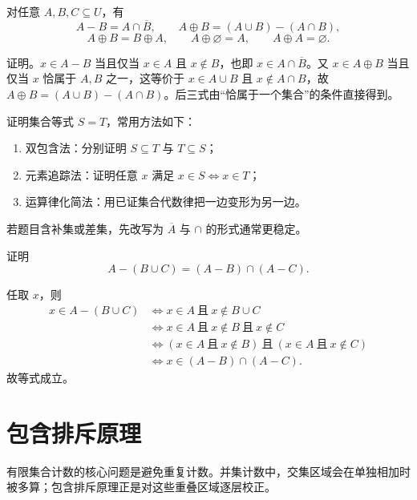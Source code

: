 \begin{theorem}[差集与对称差公式]\label{ch1-diff-sym-laws}
对任意 $A,B,C\subseteq U$，有
\[
  A-B=A\cap\overline B,\qquad
  A\oplus B=(A\cup B)-(A\cap B),
\]
\[
  A\oplus B=B\oplus A,\qquad
  A\oplus\varnothing=A,\qquad
  A\oplus A=\varnothing.
\]
\end{theorem}

证明。$x\in A-B$ 当且仅当 $x\in A$ 且 $x\notin B$，也即 $x\in A\cap\overline B$。又 $x\in A\oplus B$ 当且仅当 $x$ 恰属于 $A,B$ 之一，这等价于 $x\in A\cup B$ 且 $x\notin A\cap B$，故 $A\oplus B=(A\cup B)-(A\cap B)$。后三式由“恰属于一个集合”的条件直接得到。

\begin{method}[证明集合等式的三种方法]\label{ch1-set-proof-methods}
证明集合等式 $S=T$，常用方法如下：
\begin{enumerate}
  \item 双包含法：分别证明 $S\subseteq T$ 与 $T\subseteq S$；
  \item 元素追踪法：证明任意 $x$ 满足 $x\in S\Longleftrightarrow x\in T$；
  \item 运算律化简法：用已证集合代数律把一边变形为另一边。
\end{enumerate}
若题目含补集或差集，先改写为 $\overline A$ 与 $\cap$ 的形式通常更稳定。
\end{method}

\begin{example}[title={集合恒等式证明}]\label{ch1-set-identity-example}
证明
\[
  A-(B\cup C)=(A-B)\cap(A-C).
\]
\begin{solution}
任取 $x$，则
\[
\begin{aligned}
x\in A-(B\cup C)
&\Longleftrightarrow x\in A\ \text{且}\ x\notin B\cup C\\
&\Longleftrightarrow x\in A\ \text{且}\ x\notin B\ \text{且}\ x\notin C\\
&\Longleftrightarrow (x\in A\ \text{且}\ x\notin B)\ \text{且}\ (x\in A\ \text{且}\ x\notin C)\\
&\Longleftrightarrow x\in(A-B)\cap(A-C).
\end{aligned}
\]
故等式成立。
\end{solution}
\end{example}

\section{包含排斥原理}

有限集合计数的核心问题是避免重复计数。并集计数中，交集区域会在单独相加时被多算；包含排斥原理正是对这些重叠区域逐层校正。

